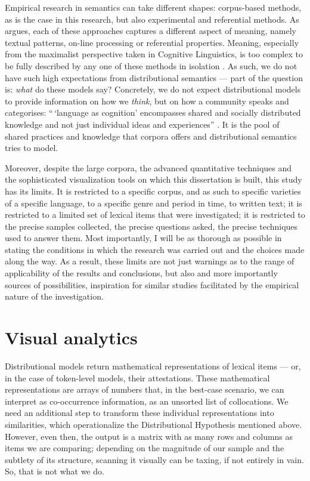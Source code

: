 \documentclass[
]{book}
\begin{document}
Empirical research in semantics can take different shapes: corpus-based methods, as is the case in this research, but also experimental and referential methods. As \textcite[242-243]{geeraerts_2015b} argues, each of these approaches captures a different aspect of meaning, namely textual patterns, on-line processing or referential properties. Meaning, especially from the maximalist perspective taken in Cognitive Linguistics, is too complex to be fully described by any one of these methods in isolation \autocites[see also][]{arppe.etal_2010,stefanowitsch_2010}. As such, we do not have such high expectations from distributional semantics --- part of the question is: \emph{what} do these models say?
Concretely, we do not expect distributional models to provide information on how we \emph{think}, but on how a community speaks and categorises: ``\,`language as cognition' encompasses shared and socially distributed knowledge and not just individual ideas and experiences'' \autocite[533]{geeraerts_2016a}. It is the pool of shared practices and knowledge that corpora offers and distributional semantics tries to model.

Moreover, despite the large corpora, the advanced quantitative techniques and the sophisticated visualization tools on which this dissertation is built, this study has its limits. It is restricted to a specific corpus, and as such to specific varieties of a specific language, to a specific genre and period in time, to written text; it is restricted to a limited set of lexical items that were investigated; it is restricted to the precise samples collected, the precise questions asked, the precise techniques used to answer them. Most importantly, I will be as thorough as possible in stating the conditions in which the research was carried out and the choices made along the way. As a result, these limits are not just warnings as to the range of applicability of the results and conclusions, but also and more importantly sources of possibilities, inspiration for similar studies facilitated by the empirical nature of the investigation.

\hypertarget{viz}{%
\section{Visual analytics}\label{viz}}

Distributional models return mathematical representations of lexical items --- or, in the case of token-level models, their attestations. These mathematical representations are arrays of numbers that, in the best-case scenario, we can interpret as co-occurrence information, as an unsorted list of collocations. We need an additional step to transform these individual representations into similarities, which operationalize the Distributional Hypothesis mentioned above. However, even then, the output is a matrix with as many rows and columns as items we are comparing; depending on the magnitude of our sample and the subtlety of its structure, scanning it visually can be taxing, if not entirely in vain. So, that is not what we do.
\end{document}
